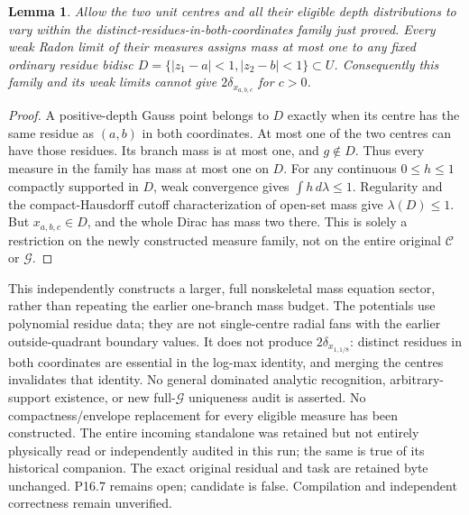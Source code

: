 \documentclass[11pt]{article}
\newtheorem{lemma}[theorem]{Lemma}
\newcommand{\C}{\mathcal C}
\newcommand{\G}{\mathcal G}
\begin{document}
\begin{lemma}\label{no-coalescence}
Allow the two unit centres and all their eligible depth distributions to
vary within the distinct-residues-in-both-coordinates family just proved.
Every weak Radon limit of their measures assigns mass at most one to
any fixed ordinary residue bidisc $D=\{|z_1-a|<1,|z_2-b|<1\}\subset U$.
Consequently this family and its weak limits cannot give
$2\delta_{x_{a,b,c}}$ for $c>0$.
\end{lemma}
\begin{proof}
A positive-depth Gauss point belongs to $D$ exactly when its centre has
the same residue as $(a,b)$ in both coordinates. At most one of the two
centres can have those residues. Its branch mass is at most one, and
$g\notin D$. Thus every measure in the family has mass at most one on
$D$. For any continuous $0\le h\le1$ compactly supported in $D$,
weak convergence gives $\int h\,d\lambda\le1$. Regularity and the
compact-Hausdorff cutoff characterization of open-set mass give
$\lambda(D)\le1$. But $x_{a,b,c}\in D$, and the whole Dirac has
mass two there. This is solely a restriction on the newly constructed
measure family, not on the entire original $\C$ or $\G$.
\end{proof}

This independently constructs a larger, full nonskeletal mass equation
sector, rather than repeating the earlier one-branch mass budget.
The potentials use polynomial residue data; they are not single-centre
radial fans with the earlier outside-quadrant boundary values.
It does not produce $2\delta_{x_{1,1/8}}$: distinct residues in both
coordinates are essential in the log-max identity, and merging the
centres invalidates that identity. No general dominated analytic
recognition, arbitrary-support existence, or new full-$\G$ uniqueness
audit is asserted. No compactness/envelope replacement for every eligible
measure has been constructed. The entire incoming standalone was retained
but not entirely physically read or independently audited in this run;
the same is true of its historical companion. The exact original residual
and task are retained byte unchanged. P16.7 remains open; candidate is
false. Compilation and independent correctness remain unverified.
\end{document}
